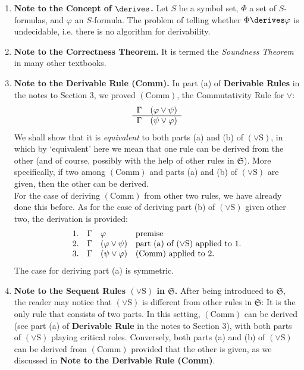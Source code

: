 \begin{enumerate}[1.]
\begin{enumerate}[(1)]
\end{enumerate}
%
\item \textbf{Note to the Concept of $\derives$.} Let $S$ be a symbol set, $\Phi$ a set of $S$-formulas, and $\varphi$ an $S$-formula. The problem of telling whether $\Phi \derives \varphi$ is undecidable, i.e. there is no algorithm for derivability.
%
\item \textbf{Note to the Correctness Theorem.} It is termed the \emph{Soundness Theorem} in many other textbooks.
%
\item \textbf{Note to the Derivable Rule (Comm).} In part (a) of \textbf{Derivable Rules} in the notes to Section 3, we proved $(\mathrm{Comm})$, the Commutativity Rule for $\lor$:
\[
\begin{array}{ll}
\Gamma & (\varphi \lor \psi) \cr\hline
\Gamma & (\psi \lor \varphi)
\end{array}
\]
We shall show that it is \emph{equivalent} to both parts (a) and (b) of $(\lor\mathrm{S})$, in which by `equivalent' here we mean that one rule can be derived from the other (and of course, possibly with the help of other rules in $\mathfrak{S}$). More specifically, if two among $(\mathrm{Comm})$ and parts (a) and (b) of $(\lor\mathrm{S})$ are given, then the other can be derived.\newline
\\
For the case of deriving $(\mathrm{Comm})$ from other two rules, we have already done this before. As for the case of deriving part (b) of $(\lor\mathrm{S})$ given other two, the derivation is provided:
\[
\begin{array}{llll}
1. & \Gamma & \varphi & \mbox{premise} \cr
2. & \Gamma & (\varphi \lor \psi) & \mbox{part $(\mathrm{a})$ of $(\lor\mathrm{S})$ applied to 1.} \cr
3. & \Gamma & (\psi \lor \varphi) & \mbox{$(\mathrm{Comm})$ applied to 2.}
\end{array}
\]
The case for deriving part (a) is symmetric.
%
\item \textbf{Note to the Sequent Rules $(\lor\mathrm{S})$ in $\mathfrak{S}$.} After being introduced to $\mathfrak{S}$, the reader may notice that $(\lor\mathrm{S})$ is different from other rules in $\mathfrak{S}$: It is the only rule that consists of two parts. In this setting, $(\mathrm{Comm})$ can be derived (see part (a) of \textbf{Derivable Rule} in the notes to Section 3), with both parts of $(\lor\mathrm{S})$ playing critical roles. Conversely, both parts (a) and (b) of $(\lor\mathrm{S})$ can be derived from $(\mathrm{Comm})$ provided that the other is given, as we discussed in \textbf{Note to the Derivable Rule (Comm)}.\newline

\end{enumerate}
